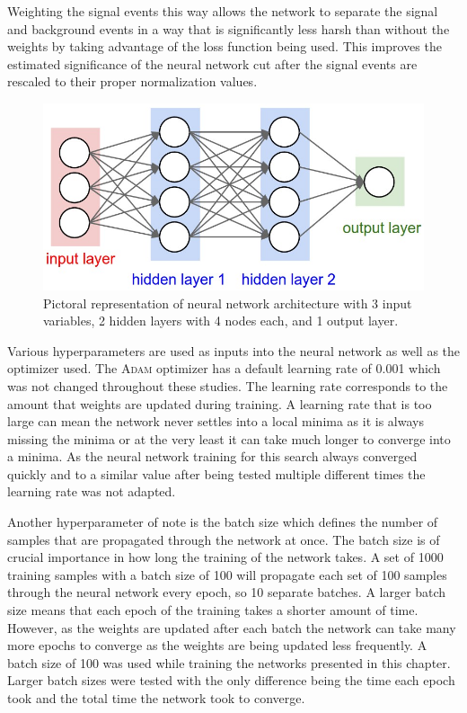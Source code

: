 Weighting the signal events this way allows the network to separate the signal and background events in a way that is significantly less harsh than without the weights by taking advantage of the loss function being used.  This improves the estimated significance of the neural network cut after the signal events are rescaled to their proper normalization values.  

\begin{figure}[h!]
	\centering
	\includegraphics[width=\columnwidth]{../ThesisImages/SearchStrategy/neural_net2.jpeg}
	\caption[Pictoral representation of neural network architecture with 3 input variables, 2 hidden layers with 4 nodes each, and 1 output layer.]{Pictoral representation of neural network architecture with 3 input variables, 2 hidden layers with 4 nodes each, and 1 output layer\cite{NNImage}.}
	\label{fig:NNArch}
\end{figure}

Various hyperparameters are used as inputs into the neural network as well as the optimizer used.  The \textsc{Adam} optimizer has a default learning rate of 0.001 which was not changed throughout these studies.   The learning rate corresponds to the amount that weights are updated during training.  A learning rate that is too large can mean the network never settles into a local minima as it is always missing the minima or at the very least it can take much longer to converge into a minima.  As the neural network training for this search always converged quickly and to a similar value after being tested multiple different times the learning rate was not adapted.  

Another hyperparameter of note is the batch size which defines the number of samples that are propagated through the network at once.  The batch size is of crucial importance in how long the training of the network takes.  A set of 1000 training samples with a batch size of 100 will propagate each set of 100 samples through the neural network every epoch, so 10 separate batches.  A larger batch size means that each epoch of the training takes a shorter amount of time.  However, as the weights are updated after each batch the network can take many more epochs to converge as the weights are being updated less frequently.  A batch size of 100 was used while training the networks presented in this chapter.  Larger batch sizes were tested with the only difference being the time each epoch took and the total time the network took to converge.

